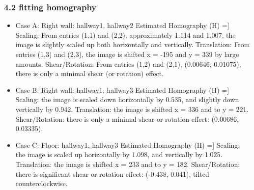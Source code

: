 \documentclass{article}
\begin{document}
\subsubsection*{4.2 fitting homography}
\begin{itemize}
    \item Case A: Right wall: hallway1, hallway2\newline
    Estimated Homography (H) =\newline
    [[ 1.11418672e+00  6.45826835e-03 -1.95425538e+02]\newline
    [ 1.07535227e-02  1.00748626e+00  3.38631466e+02]\newline
    [ 9.21056763e-05 -6.81090744e-05  1.00000000e+00]]\newline
    Scaling: From entries (1,1) and (2,2), approximately 1.114 and 1.007, the image is slightly scaled up both horizontally and vertically.\newline
    Translation: From entries (1,3) and (2,3), the image is shifted x = -195 and y = 339 by large amounts.\newline
    Shear/Rotation: From entries (1,2) and (2,1), (0.00646, 0.01075), there is only a minimal shear (or rotation) effect.
    \item Case B: Right wall: hallway1, hallway3\newline
    Estimated Homography (H) =\newline
    [[ 5.34898952e-01  6.85763306e-03  3.35930226e+02]\newline
    [-3.33510849e-02  9.41727594e-01  2.20856776e+02]\newline
    [-3.25040521e-05 -2.51289448e-05  1.00000000e+00]]\newline
    Scaling: the image is scaled down horizontally by 0.535, and slightly down vertically by 0.942.\newline
    Translation: the image is shifted x = 336 and to y = 221.\newline
    Shear/Rotation: there is only a minimal shear or rotation effect: (0.00686, 0.03335).
    \item Case C: Floor: hallway1, hallway3\newline
    Estimated Homography (H) =\newline
    [[ 1.09817473e+00 -4.38647155e-01  2.32965909e+02]\newline
    [ 4.12180152e-02  1.02463157e+00  1.81945408e+02]\newline
    [ 7.87914388e-05 -2.84615181e-05  1.00000000e+00]]\newline
    Scaling: the image is scaled up horizontally by 1.098, and vertically by 1.025.\newline
    Translation: the image is shifted x = 233 and to y = 182.\newline
    Shear/Rotation: there is significant shear or rotation effect: (-0.438, 0.041), tilted counterclockwise.
\end{itemize}
\end{document}
